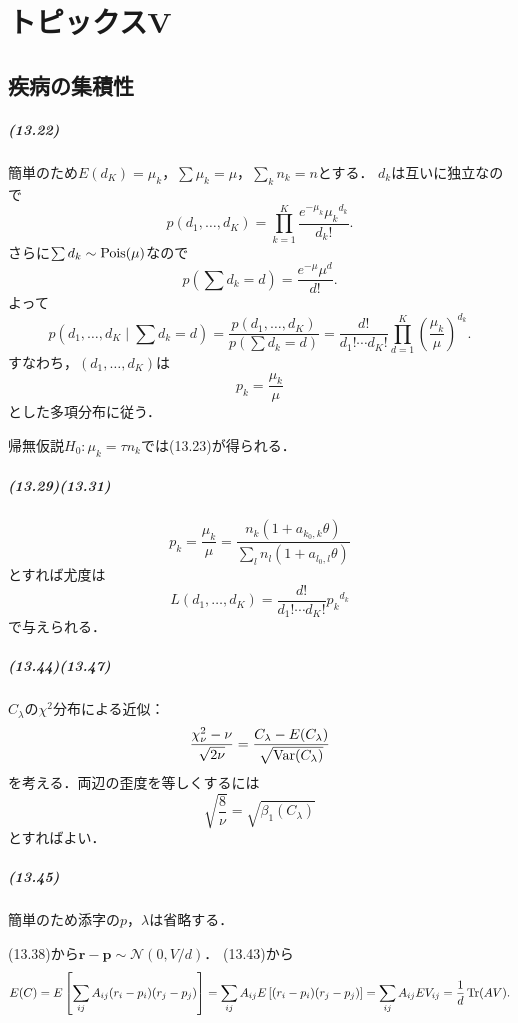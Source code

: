 \chapter{トピックスV}
\setcounter{section}{4}
\section{疾病の集積性}
\paragraph{(13.22)}
簡単のため\(E(d_K) = \mu_k\)，\(\sum\mu_k = \mu\)，\(\sum_k n_k = n\)とする．
\(d_k\)は互いに独立なので
\[ p(d_1, \ldots, d_K) = \prod_{k=1}^K \frac{e^{-\mu_k} \mu_k{}^{d_k}}{d_k!} . \]
さらに\(\sum d_k \sim \operatorname{Pois}(\mu)\)なので
\[ p\left(\sum d_k = d\right) = \frac{e^{-\mu} \mu^d}{d!} . \]
よって
\[
p(d_1, \ldots, d_K \mid \sum d_k = d)
= \frac{p(d_1, \ldots, d_K)}{p\left(\sum d_k = d\right)}
= \frac{d!}{d_1! \cdots d_K!} \prod_{d=1}^K \left( \frac{\mu_k}{\mu} \right)^{d_k} .
\]
すなわち，\((d_1, \ldots, d_K)\)は
\[ p_k = \frac{\mu_k}{\mu} \]
とした多項分布に従う．

帰無仮説\(H_0 \colon \mu_k = \tau n_k\)では(13.23)が得られる．

\paragraph{(13.29)(13.31)}
\[ p_k = \frac{\mu_k}{\mu} = \frac{n_k (1+a_{k_0,k}\theta)}{\sum_l n_l (1+a_{l_0,l}\theta)} \]
とすれば尤度は
\[ L(d_1, \ldots, d_K) = \frac{d!}{d_1! \cdots d_K!} p_k{}^{d_k} \]
で与えられる．

\paragraph{(13.44)(13.47)}
\(C_\lambda\)の\(\chi^2\)分布による近似：
\[ \frac{\chi_\nu^2 - \nu}{\sqrt{2\nu}} = \frac{C_\lambda - E(C_\lambda)}{\sqrt{\operatorname{Var}(C_\lambda)}} \]
を考える．両辺の歪度を等しくするには
\[ \sqrt{\frac{8}{\nu}} = \sqrt{\beta_1(C_\lambda)} \]
とすればよい．

\paragraph{(13.45)}
簡単のため添字の\(p\)，\(\lambda\)は省略する．

(13.38)から\( \boldsymbol{r} - \boldsymbol{p} \sim \mathcal{N}(0, V/d) \)．
(13.43)から
\[
E(C) = E \left[ \sum_{ij} A_{ij} (r_i-p_i) (r_j-p_j) \right]
= \sum_{ij} A_{ij} E \left[ (r_i-p_i) (r_j-p_j) \right]
= \sum_{ij} A_{ij} E V_{ij}
= \frac{1}{d} \operatorname{Tr}(AV) .
\]

